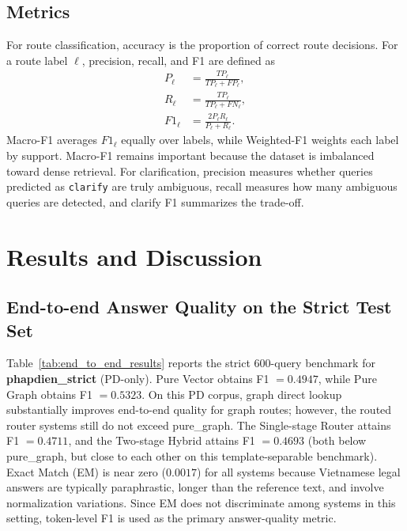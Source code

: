 \documentclass[11pt,twocolumn]{article}
\begin{document}
\subsection{Metrics}
\label{subsec:metrics}

For route classification, accuracy is the proportion of
correct route decisions. For a route label $\ell$, precision,
recall, and F1 are defined as
\begin{align}
P_\ell &= \frac{TP_\ell}{TP_\ell+FP_\ell},\\
R_\ell &= \frac{TP_\ell}{TP_\ell+FN_\ell},\\
F1_\ell &= \frac{2P_\ell R_\ell}{P_\ell+R_\ell}.
\end{align}
Macro-F1 averages $F1_\ell$ equally over labels, while
Weighted-F1 weights each label by support. Macro-F1 remains
important because the dataset is imbalanced toward dense
retrieval. For clarification, precision measures whether
queries predicted as \texttt{clarify} are truly ambiguous,
recall measures how many ambiguous queries are detected, and
clarify F1 summarizes the trade-off.

\FloatBarrier

\section{Results and Discussion}
\label{sec:results_discussion}

\subsection{End-to-end Answer Quality on the Strict Test Set}
\label{subsec:end_to_end_results}

Table~\ref{tab:end_to_end_results} reports the strict
$600$-query benchmark for \textbf{phapdien\_strict} (PD-only).
Pure Vector obtains F1 $=0.4947$,
while Pure Graph obtains F1 $=0.5323$. On this PD corpus,
graph direct lookup substantially improves end-to-end quality for graph
routes; however, the routed router systems still do not exceed pure_graph.
The Single-stage Router attains
F1 $=0.4711$, and the Two-stage Hybrid attains
F1 $=0.4693$ (both below pure_graph, but close to each other on this
template-separable benchmark).
Exact Match (EM) is near zero ($0.0017$) for all systems
because Vietnamese legal answers are typically paraphrastic,
longer than the reference text, and involve normalization
variations. Since EM does not discriminate among systems in
this setting, token-level F1 is used as the primary
answer-quality metric.
\end{document}
